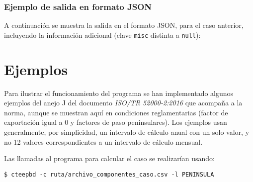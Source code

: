 \documentclass[10pt,notitlepage,oneside,a4paper]{article}
\begin{document}
\subsubsection{Ejemplo de salida en formato JSON}

A continuación se muestra la salida en el formato JSON, para el caso anterior, incluyendo la información adicional (clave \texttt{misc} distinta a \texttt{null}):



\clearpage
\newpage


\setcounter{section}{0} %
\renewcommand\thesection{Anexo~\Roman{section}}
\renewcommand\theHsection{Anexo~\Roman{section}}
\renewcommand\thesubsection{\Roman{section}.\arabic{subsection}}
\renewcommand\theHsubsection{\Roman{section}.\arabic{subsection}}
\renewcommand{\thefigure}{\Roman{section}.\arabic{figure}}
\renewcommand{\theHfigure}{\Roman{section}.\arabic{figure}}
\renewcommand{\thetable}{\Roman{section}.\arabic{table}}
\renewcommand{\theHtable}{\Roman{section}.\arabic{table}}

\section{Ejemplos}
\label{sec:anexoejemplos}
\setcounter{figure}{0} %
\setcounter{table}{0} %

Para ilustrar el funcionamiento del programa se han implementado algunos ejemplos del anejo J del documento \textit{ISO/TR 52000-2:2016} que acompaña a la norma, aunque se muestran aquí en condiciones reglamentarias (factor de exportación igual a 0 y factores de paso peninsulares). Los ejemplos usan generalmente, por simplicidad, un intervalo de cálculo anual con un solo valor, y no 12 valores correspondientes a un intervalo de cálculo mensual.

Las llamadas al programa para calcular el caso se realizarían usando:

\begin{Verbatim}[fontsize=\small]
    $ cteepbd -c ruta/archivo_componentes_caso.csv -l PENINSULA
\end{Verbatim}
\end{document}
